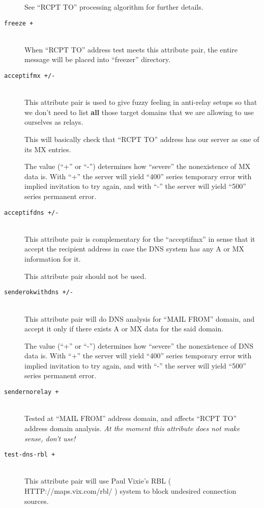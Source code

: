 \begin{description}
See ``RCPT TO'' processing algorithm for further details.

\item[\tt freeze +] \mbox{} \\
When ``RCPT TO'' address test meets this attribute pair, the entire
message will be placed into ``freezer'' directory.

\item[\tt acceptifmx +/-] \mbox{} \\
This attribute pair is used to give fuzzy feeling in anti-relay setups
so that we don't need to list {\bf all} those target domains that we
are allowing to use ourselves as relays.

This will basically check that ``RCPT TO'' address has our server
as one of its MX entries.

The value (``+'' or ``-'') determines how ``severe'' the nonexistence
of MX data is.  With ``+'' the server will yield ``400'' series temporary
error with implied invitation to try again, and with ``-'' the server will
yield ``500'' series permanent error.

\item[\tt acceptifdns +/-] \mbox{} \\
This attribute pair is complementary for the ``acceptifmx'' in sense
that it accept the recipient address in case the DNS system has any
A or MX information for it.

This attribute pair should not be used.

\item[\tt senderokwithdns +/-] \mbox{} \\
This attribute pair will do DNS analysis for ``MAIL FROM'' domain, and
accept it only if there exists A or MX data for the said domain.

The value (``+'' or ``-'') determines how ``severe'' the nonexistence
of DNS data is.  With ``+'' the server will yield ``400'' series temporary
error with implied invitation to try again, and with ``-'' the server will
yield ``500'' series permanent error.


\item[\tt sendernorelay +] \mbox{} \\
Tested at ``MAIL FROM'' address domain, and affects ``RCPT TO''
address domain analysis.
{\em At the moment this attribute does not make sense, don't use!}

\item[\tt test-dns-rbl +] \mbox{} \\
This attribute pair will use Paul Vixie's RBL
( HTTP://maps.vix.com/rbl/ )
system to block undesired connection sources.


\end{description}
